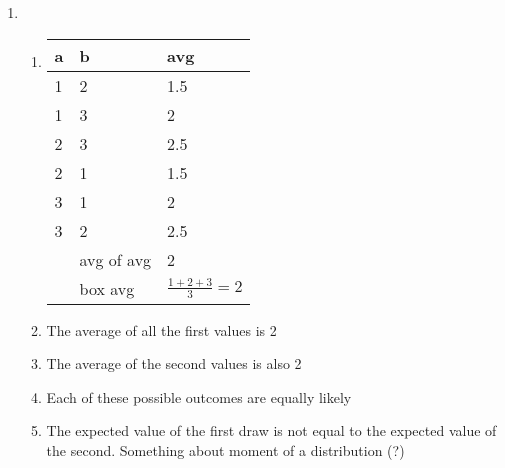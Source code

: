 \documentclass[12pt]{article}
\begin{document}
\begin{enumerate}
    \item
        \begin{enumerate}
            \item [a.]
            \begin{tabular}{|a | a | a|}
            a & b & avg \\
            \hline{} & 2 & 1.5\\
            1 & 3 & 2 \\
            2 & 3 & 2.5 \\
            2 & 1 & 1.5 \\
            3 & 1 & 2 \\
            3 & 2 & 2.5 \\
            \hline
             & avg of avg & 2 \\
             \hline
             & box avg & $ \frac{1+2+3}{3} = 2 $ \\
            \hline\hline
            \end{tabular}
            \item [b.]
            The average of all the first values is 2
            \item [c.]
            The average of the second values is also 2
            \item [d.]
            Each of these possible outcomes are equally likely
            \item [e.]
            The expected value of the first draw is not equal to the expected value of the second. Something about moment of a distribution (?)


        \end{enumerate}

\end{enumerate}
\end{document}
